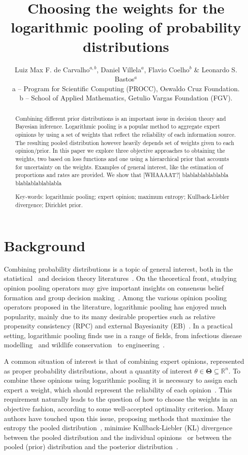 \documentclass[a4paper, notitlepage, 10pt]{article}
\title{\vspace{-9ex}\centering \bf Choosing the weights for the logarithmic pooling of probability distributions}
\author{
Luiz Max F. de Carvalho$^{a,b}$, Daniel Villela$^a$, Flavio Coelho$^b$ \& Leonardo S. Bastos$^a$ \\
a -- Program for Scientific Computing (PROCC), Oswaldo Cruz Foundation. \\
b -- School of Applied Mathematics, Getulio Vargas Foundation (FGV).
}
\begin{document}
\maketitle

\begin{abstract}
Combining different prior distributions is an important issue in decision theory and Bayesian inference.
Logarithmic pooling is a popular method to aggregate expert opinions by using a set of weights that reflect the reliability of each information source.
The resulting pooled distribution however heavily depends set of weights given to each opinion/prior.
In this paper we explore three objective approaches to obtaining the weights, two based on loss functions and one using a hierarchical prior that accounts for uncertainty on the weights. 
Examples of general interest, like the estimation of proportions and rates are provided.
We show that [WHAAAAT?]
blablablablablabla
blablablablablabla

Key-words: logarithmic pooling; expert opinion; maximum entropy; Kullback-Liebler divergence; Dirichlet prior. 
\end{abstract}

\section*{Background}

Combining probability distributions is a topic of general interest, both in the statistical~\citep{genest1986A,genest1986B} and decision theory literatures~\citep{genest1984}.
On the theoretical front, studying opinion pooling operators may give important insights on consensus belief formation and group decision making~\citep{genest1986B}.
Among the various opinion pooling operators proposed in the literature, logarithmic pooling has enjoyed much popularity, mainly due to its many desirable properties such as relative propensity consistency (RPC) and external Bayesianity (EB)~\citep{genest1986A}. 
In a practical setting, logarithmic pooling finds use in a range of fields, from infectious disease modelling~\citep{Coelho2009} and wildlife conservation~\citep{poole2000} to engineering~\citep{lind1988, savchuk1994}.

A common situation of interest is that of combining expert opinions, represented as proper probability distributions, about a quantity of interest $\theta \in \mathbf{\Theta} \subseteq \mathbb{R}^n$.
To combine these opinions using logarithmic pooling it is necessary to assign each expert a weight, which should represent the reliability of each opinion~\citep{genest1984}.
This requirement naturally leads to the question of how to choose the weights in 
an objective  fashion, according to some 
well-accepted optimality criterion.
Many authors have touched upon this issue, proposing methods that maximise the entropy the pooled distribution~\cite{myung1996}, minimise Kullback-Liebler (KL) divergence between the pooled distribution and the individual opinions~\citep{abbas2009} or between the pooled (prior) distribution and the posterior distribution~\citep{rufo2012A, rufo2012B}.
\end{document}
